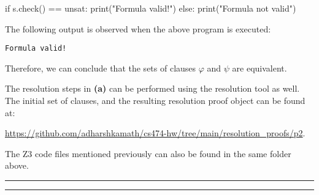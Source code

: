 \documentclass[12pt,letterpaper, onecolumn]{exam}
\newcommand{\link}[1]{{\color{blue}\href{#1}{#1}}}
\begin{document}
\begin{questions}
\begin{python}
if s.check() == unsat:
	print("Formula valid!")
else:
	print("Formula not valid")
\end{python}

The following output is observed when the above program is executed:
\begin{lstlisting}
Formula valid!
\end{lstlisting}

Therefore, we can conclude that the sets of clauses $ \varphi $ and $ \psi $ are equivalent. 

The resolution steps in \textbf{(a)} can be performed using the resolution tool as well.
The initial set of clauses, and the resulting resolution proof object can be found at:

\link{https://github.com/adharshkamath/cs474-hw/tree/main/resolution\_proofs/p2}.

The Z3 code files mentioned previously can also be found in the same folder above.


    {\rule{17cm}{0.4pt}}
	\question[]
	\solutiontitle



    {\rule{17cm}{0.4pt}}

\end{questions}
\end{document}
